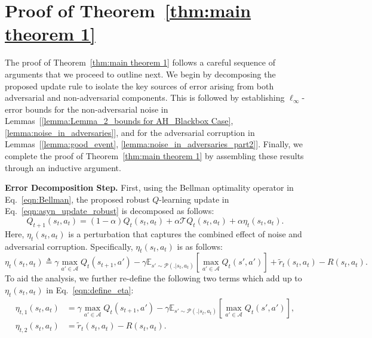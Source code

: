 \documentclass{article}
\newcommand{\mc}{\mathcal}
\begin{document}
\section{Proof of Theorem~\ref{thm:main theorem 1}}
\label{app:Proof_knownmeanvar}
The proof of Theorem~\ref{thm:main theorem 1} follows a careful sequence of arguments that we proceed to outline next. We begin by decomposing the proposed update rule to isolate the key sources of error arising from both adversarial and non-adversarial components. This is followed by establishing \(\ell_\infty\)-error bounds for the non-adversarial noise in Lemmas~[\ref{lemma:Lemma_2_bounds for AH_Blackbox Case},\ref{lemma:noise_in_adversaries}], and for the adversarial corruption in Lemmas~[\ref{lemma:good_event}, \ref{lemma:noise_in_adversaries_part2}]. Finally, we complete the proof of Theorem~\ref{thm:main theorem 1} by assembling these results through an inductive argument. 

\textbf{Error Decomposition Step.} First, using the Bellman optimality operator in Eq.~\eqref{eqn:Bellman}, the proposed robust \(Q\)-learning update in Eq.~\eqref{eqn:asyn_update_robust} is decomposed as follows:
\begin{equation}\label{eqn:Final_Q_Learning}
    Q_{t+1}(s_t, a_t) = (1 - \alpha)Q_t(s_t, a_t) + \alpha \mathcal{T}Q_t(s_t, a_t) + \alpha \eta_t(s_t, a_t).
\end{equation}
Here, \(\eta_t(s_t, a_t)\) is a perturbation that captures the combined effect of noise and adversarial corruption. Specifically, \(\eta_t(s_t, a_t)\) is as follows: 
\begin{equation}\label{eqn:define_eta}
    \eta_t(s_t, a_t) \triangleq \gamma \max_{a' \in \mathcal{A}} Q_t(s_{t+1}, a') - \gamma \mathbb{E}_{s' \sim \mc{P}(.|s_t, a_t)}\left[ \max_{a' \in \mathcal{A}} Q_t(s', a') \right] + \tilde{r}_t(s_t,a_t) - R(s_t, a_t).
\end{equation}
To aid the analysis, we further re-define the following two terms which add up to \(\eta_t(s_t,a_t)\) in Eq.~\eqref{eqn:define_eta}:
\begin{equation}\label{eqn:drift_params_1}
    \begin{aligned}
        \eta_{t,1}(s_t,a_t) &= \gamma \max_{a' \in \mathcal{A}} Q_t(s_{t+1}, a') - \gamma \mathbb{E}_{s' \sim \mc{P}(.|s_t, a_t)}\left[ \max_{a' \in \mathcal{A}} Q_t(s', a') \right], \\
        \eta_{t,2}(s_t,a_t) &= \tilde{r}_t(s_t,a_t) - R(s_t, a_t). 
    \end{aligned}
\end{equation}
\end{document}
